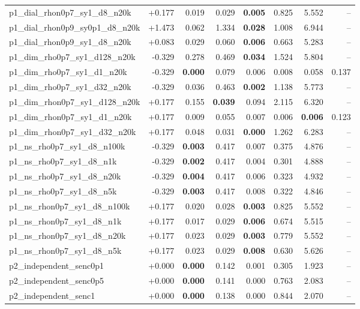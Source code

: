 \documentclass[11pt]{article}
\begin{document}
\begin{longtable}{lrrrrrrr}
p1\_dial\_rhon0p7\_sy1\_d8\_n20k & +0.177 & 0.019 & 0.029 & \textbf{0.005} & 0.825 & 5.552 & --\\
p1\_dial\_rhon0p9\_sy0p1\_d8\_n20k & +1.473 & 0.062 & 1.334 & \textbf{0.028} & 1.008 & 6.944 & --\\
p1\_dial\_rhon0p9\_sy1\_d8\_n20k & +0.083 & 0.029 & 0.060 & \textbf{0.006} & 0.663 & 5.283 & --\\
p1\_dim\_rho0p7\_sy1\_d128\_n20k & -0.329 & 0.278 & 0.469 & \textbf{0.034} & 1.524 & 5.804 & --\\
p1\_dim\_rho0p7\_sy1\_d1\_n20k & -0.329 & \textbf{0.000} & 0.079 & 0.006 & 0.008 & 0.058 & 0.137\\
p1\_dim\_rho0p7\_sy1\_d32\_n20k & -0.329 & 0.036 & 0.463 & \textbf{0.002} & 1.138 & 5.773 & --\\
p1\_dim\_rhon0p7\_sy1\_d128\_n20k & +0.177 & 0.155 & \textbf{0.039} & 0.094 & 2.115 & 6.320 & --\\
p1\_dim\_rhon0p7\_sy1\_d1\_n20k & +0.177 & 0.009 & 0.055 & 0.007 & 0.006 & \textbf{0.006} & 0.123\\
p1\_dim\_rhon0p7\_sy1\_d32\_n20k & +0.177 & 0.048 & 0.031 & \textbf{0.000} & 1.262 & 6.283 & --\\
p1\_ns\_rho0p7\_sy1\_d8\_n100k & -0.329 & \textbf{0.003} & 0.417 & 0.007 & 0.375 & 4.876 & --\\
p1\_ns\_rho0p7\_sy1\_d8\_n1k & -0.329 & \textbf{0.002} & 0.417 & 0.004 & 0.301 & 4.888 & --\\
p1\_ns\_rho0p7\_sy1\_d8\_n20k & -0.329 & \textbf{0.004} & 0.417 & 0.006 & 0.323 & 4.932 & --\\
p1\_ns\_rho0p7\_sy1\_d8\_n5k & -0.329 & \textbf{0.003} & 0.417 & 0.008 & 0.322 & 4.846 & --\\
p1\_ns\_rhon0p7\_sy1\_d8\_n100k & +0.177 & 0.020 & 0.028 & \textbf{0.003} & 0.825 & 5.552 & --\\
p1\_ns\_rhon0p7\_sy1\_d8\_n1k & +0.177 & 0.017 & 0.029 & \textbf{0.006} & 0.674 & 5.515 & --\\
p1\_ns\_rhon0p7\_sy1\_d8\_n20k & +0.177 & 0.023 & 0.029 & \textbf{0.003} & 0.779 & 5.552 & --\\
p1\_ns\_rhon0p7\_sy1\_d8\_n5k & +0.177 & 0.023 & 0.029 & \textbf{0.008} & 0.630 & 5.626 & --\\
p2\_independent\_senc0p1 & +0.000 & \textbf{0.000} & 0.142 & 0.001 & 0.305 & 1.923 & --\\
p2\_independent\_senc0p5 & +0.000 & \textbf{0.000} & 0.141 & 0.000 & 0.763 & 2.083 & --\\
p2\_independent\_senc1 & +0.000 & \textbf{0.000} & 0.138 & 0.000 & 0.844 & 2.070 & --\\

\end{longtable}
\end{document}
